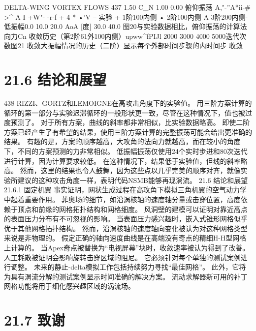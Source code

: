 \documentclass[UTF8,11pt,a4paper,openany,fontset=fandol]{ctexbook}
\begin{document}
DELTA-WING VORTEX FLOWS 437 1.50 C\_N 1.00 0.00 俯仰振荡 A,"-''A*ii-\# >\textasciicircum{} A I +W"- -r-f + 4 * •'V -- 实验 + 1阶100内侧 • 2阶100内侧 A 3阶200内侧-低振幅0.0 10.0 20.0 AoA [度] 30.0 40.0 图20与实验数据相比，俯仰振荡的计算法向力Cn 收敛历史（第2阶61外100内侧）upww\textasciicircum{}fPIJl 2000 3000 4000 5000迭代次数图21 收敛大振幅情况的历史（二阶）显示每个外部时间步骤的内时间步 收敛

\section{21.6 结论和展望}
438 RIZZI、GORTZ和LEMOIGNE在高攻击角度下的实验值。 用三阶方案计算的循环的第一部分与实验迟滞循环的一般形状更一致，尽管在这种情况下，值也被过度预测了。 对于所有方案，曲线的斜率都非常相似，比实验数据略高。 即使二阶方案已经产生了有希望的结果，使用三阶方案计算的完整振荡可能会给出更准确的结果。 有趣的是，方案的顺序越高，大攻角的法向力就越高，而在较小的角度下，不同的方案预测的力非常相似。 低振幅振荡仅使用24个实时步进和80次迭代进行计算，因为计算要求较低。 在这种情况下，结果低于实验值，但线的斜率略高。 然而，这里的结果也令人鼓舞，因为这些点以几乎完美的顺序对齐，就像实验所建议的这种攻击角度一样，表明代码NSMB能够再现涡流。 21.6 结论和展望 21.6.1 固定机翼 事实证明，网状生成过程在高攻角下模拟三角机翼的空气动力学中起着重要作用。 菲奥场的细节，如沿涡核轴的速度轴分量或击穿位置，高度依赖于顶点和前缘的网格拓扑结构和网格细度。 风洞壁的建模可以证明对靠近高点的表面压力分布有不可忽视的影响。 当表面压力感兴趣时，嵌入式锥形网格似乎优于其他网格拓扑结构。 然而，沿涡核轴的速度轴向变化被认为对这种网格类型来说是非物理的。 假定正确的轴向速度曲线是在高端没有奇点的精细H-H型网格上计算的。 当Apex奇点被替换为“电视屏幕”块时，收敛速率被认为得到了改善。 人工耗散被证明会影响旋转击穿区域的阻尼。 它必须针对每个单独的测试案例进行调整。 未来的静止-delta模拟工作包括持续努力寻找“最佳网格”。 此外，它将为具有涡流分解的测试案例显示时间准确的解决方案。 流动求解器新可用的补丁网格功能将用于细化感兴趣区域的涡流场。

\section{21.7 致谢}
\end{document}
